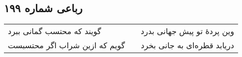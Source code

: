 \begin{center}
\section*{رباعی شماره ۱۹۹}
\label{sec:sh199}
\begin{longtable}{l p{0.5cm} r}
گویند که محتسب گمانی ببرد
&&
وین پردهٔ تو پیش جهانی بدرد
\\
گویم که ازین شراب اگر محتسبست
&&
دریابد قطره‌ای به جانی بخرد
\\
\end{longtable}
\end{center}
